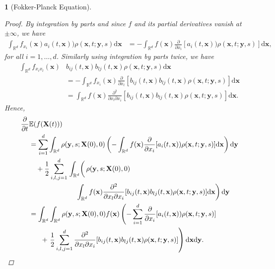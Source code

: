 \documentclass[english]{article}
\numberwithin{equation}{section}
\numberwithin{figure}{section}
\theoremstyle{bolddescit}
\newtheorem{theorem}{\protect\theoremname}[section]
\theoremstyle{definition}
\theoremstyle{definition}
\theoremstyle{plain}
\theoremstyle{plain}
\theoremstyle{bolddesc}
\theoremstyle{plain}
\theoremstyle{remark}
\providecommand{\theoremname}{Theorem}
\begin{document}
\begin{theorem}[Fokker-Planck Equation]
\begin{proof}
    By integration by parts and since $f$ and its partial derivatives vanish at $\pm \infty$, we have
    \begin{align*}
      \int_{\mathbb{R}^d} f_{x_i}(\mathbf{x}) a_i(t,\mathbf{x}))\rho(\mathbf{x},t;\mathbf{y},s) \mathrm{d}\mathbf{x}
      &= - \int_{\mathbb{R}^d} f(\mathbf{x}) \frac{\partial}{\partial x_i}[a_i(t,\mathbf{x}))\rho(\mathbf{x},t;\mathbf{y},s)] \mathrm{d}\mathbf{x},
    \end{align*}
    for all $i=1,\ldots,d$. Similarly using integration by parts twice, we have
    \begin{align*}
      \int_{\mathbb{R}^d} f_{x_i x_l}(\mathbf{x}) &b_{ij}(t,\mathbf{x}) b_{lj}(t,\mathbf{x}) \rho(\mathbf{x},t;\mathbf{y},s) \mathrm{d}\mathbf{x}\\
      &= - \int_{\mathbb{R}^d} f_{x_i}(\mathbf{x}) \frac{\partial}{\partial x_l}[b_{ij}(t,\mathbf{x}) b_{lj}(t,\mathbf{x}) \rho(\mathbf{x},t;\mathbf{y},s)] \mathrm{d}\mathbf{x}\\
      &= \int_{\mathbb{R}^d} f(\mathbf{x}) \frac{\partial^2}{\partial x_l \partial x_i}[b_{ij}(t,\mathbf{x}) b_{lj}(t,\mathbf{x}) \rho(\mathbf{x},t;\mathbf{y},s)] \mathrm{d}\mathbf{x}.
    \end{align*}
    Hence,
    \begin{align}
      \frac{\partial}{\partial t}&\mathbb{E}(f(\mathbf{X}(t)))\notag\\
      &= \sum_{i=1}^{d} \int_{\mathbb{R}^d} \rho(\mathbf{y},s;\mathbf{X}(0),0) \left( - \int_{\mathbb{R}^d} f(\mathbf{x}) \frac{\partial}{\partial x_i}[a_i(t,\mathbf{x}))\rho(\mathbf{x},t;\mathbf{y},s)] \mathrm{d}\mathbf{x} \right) \mathrm{d}\mathbf{y}\notag\\
        &\ \ \ + \frac{1}{2} \sum_{i,l,j=1}^{d} \left.\int_{\mathbb{R}^d} \right(\rho(\mathbf{y},s;\mathbf{X}(0),0) \notag\\
        &\ \ \ \ \ \ \ \ \ \ \ \ \ \ \ \ \ \ \ \ \left.\int_{\mathbb{R}^d} f(\mathbf{x}) \frac{\partial^2}{\partial x_l \partial x_i}[b_{ij}(t,\mathbf{x}) b_{lj}(t,\mathbf{x}) \rho(\mathbf{x},t;\mathbf{y},s)] \mathrm{d}\mathbf{x} \right)\mathrm{d}\mathbf{y}\notag\\
      &= \int_{\mathbb{R}^d} \int_{\mathbb{R}^d} \rho(\mathbf{y},s;\mathbf{X}(0),0) f(\mathbf{x}) \left(- \sum_{i=1}^d \frac{\partial}{\partial x_i}[a_i(t,\mathbf{x}))\rho(\mathbf{x},t;\mathbf{y},s)] \right.\notag\\
        &\ \ \ \ \ + \left.\frac{1}{2} \sum_{i,l,j=1}^{d} \frac{\partial^2}{\partial x_l \partial x_i}[b_{ij}(t,\mathbf{x}) b_{lj}(t,\mathbf{x}) \rho(\mathbf{x},t;\mathbf{y},s)] \right) \mathrm{d}\mathbf{x} \mathrm{d}\mathbf{y}.\label{eq:fp-proof-1}
    \end{align}


\end{proof}
\end{theorem}
\end{document}
